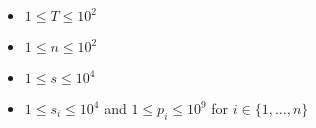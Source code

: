 \begin{itemize}
\tightlist
\item $1 \le T \le 10^2$
\item $1 \le n \le 10^2$
\item $1 \le s \le 10^4$
\item $1 \le s_i \le 10^4$ and $1 \le p_i \le 10^9$ for $i\in\{1,\dots,n\}$
\end{itemize}
